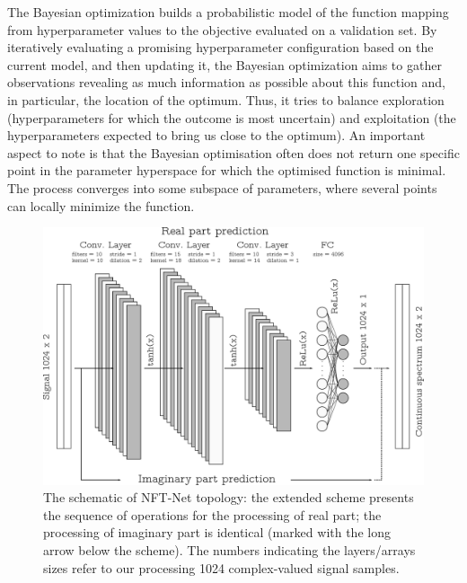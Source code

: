 The Bayesian optimization builds a probabilistic model of the function mapping from hyperparameter values to the objective evaluated on a validation set\cite{mockus1975bayesian,pelikan1999boa}. By iteratively evaluating a promising hyperparameter configuration based on the current model, and then updating it, the Bayesian optimization aims to gather observations revealing as much information as possible about this function and, in particular, the location of the optimum. Thus, it tries to balance exploration (hyperparameters for which the outcome is most uncertain) and exploitation (the hyperparameters expected to bring us close to the optimum).
An important aspect to note is that the Bayesian optimisation often does not return one specific point in the parameter hyperspace for which the optimised function is minimal. The process converges into some subspace of parameters, where several points can locally minimize the function\cite{pelikan1999boa}.

\begin{figure}[tbph]
    \centering
    \includegraphics[width=1.0\linewidth]{images/nn_nft/arch_new.pdf}
    \caption{The schematic of NFT-Net topology: the extended scheme presents the sequence of operations for the processing of real part; the processing of imaginary part is identical (marked with the long arrow below the scheme). The numbers indicating the layers/arrays sizes refer to our processing 1024 complex-valued signal samples.}
    \label{fig:nn_architecture}
\end{figure}


